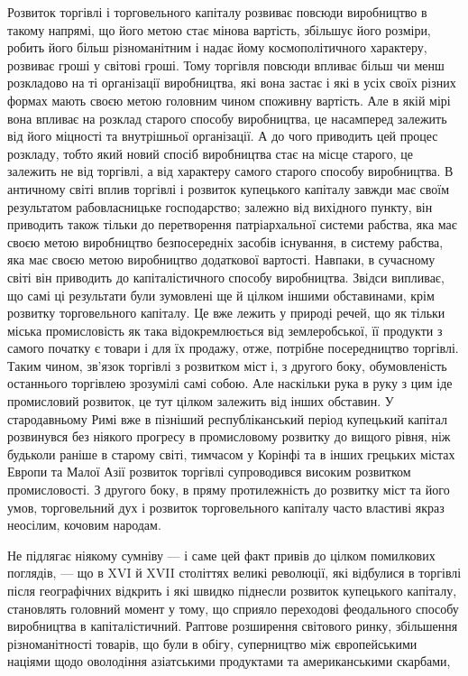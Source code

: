 Розвиток торгівлі і торговельного капіталу розвиває повсюди
виробництво в такому напрямі, що його метою стає мінова вартість,
збільшує його розміри, робить його більш різноманітним і
надає йому космополітичного характеру, розвиває гроші у світові
гроші. Тому торгівля повсюди впливає більш чи менш розкладово
на ті організації виробництва, які вона застає і які в усіх
своїх різних формах мають своєю метою головним чином споживну
вартість. Але в якій мірі вона впливає на розклад старого
способу виробництва, це насамперед залежить від його
міцності та внутрішньої організації. А до чого приводить цей
процес розкладу, тобто який новий спосіб виробництва стає на
місце старого, це залежить не від торгівлі, а від характеру
самого старого способу виробництва. В античному світі вплив
торгівлі і розвиток купецького капіталу завжди має своїм результатом
рабовласницьке господарство; залежно від вихідного
пункту, він приводить також тільки до перетворення патріархальної
системи рабства, яка має своєю метою виробництво безпосередніх
засобів існування, в систему рабства, яка має своєю
метою виробництво додаткової вартості. Навпаки, в сучасному
світі він приводить до капіталістичного способу виробництва.
Звідси випливає, що самі ці результати були зумовлені ще
й цілком іншими обставинами, крім розвитку торговельного капіталу.
Це вже лежить у природі речей, що як тільки міська промисловість
як така відокремлюється від землеробської, її продукти
з самого початку є товари і для їх продажу, отже, потрібне
посередництво торгівлі. Таким чином, зв’язок торгівлі
з розвитком міст і, з другого боку, обумовленість останнього
торгівлею зрозумілі самі собою. Але наскільки рука в руку
з цим іде промисловий розвиток, це тут цілком залежить від
інших обставин. У стародавньому Римі вже в пізніший республіканський
період купецький капітал розвинувся без ніякого
прогресу в промисловому розвитку до вищого рівня, ніж будьколи
раніше в старому світі, тимчасом у Корінфі та в інших
грецьких містах Европи та Малої Азії розвиток торгівлі супроводився
високим розвитком промисловості. З другого боку,
в пряму протилежність до розвитку міст та його умов, торговельний
дух і розвиток торговельного капіталу часто властиві
якраз неосілим, кочовим народам.

Не підлягає ніякому сумніву — і саме цей факт привів до
цілком помилкових поглядів, — що в XVI й XVII століттях великі
революції, які відбулися в торгівлі після географічних відкрить
і які швидко піднесли розвиток купецького капіталу,
становлять головний момент у тому, що сприяло переходові
феодального способу виробництва в капіталістичний. Раптове
розширення світового ринку, збільшення різноманітності товарів,
що були в обігу, суперництво між європейськими націями щодо
оволодіння азіатськими продуктами та американськими скарбами,
\parbreak{}  %
